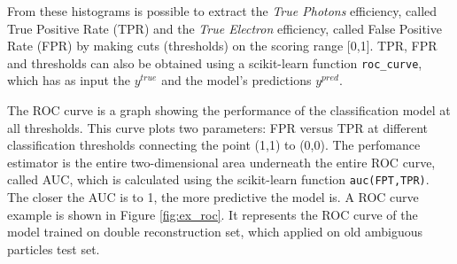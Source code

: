 \documentclass[a4paper, oneside]{book}
\begin{document}
		    From these histograms is possible to extract the \textit{True Photons} efficiency, called True Positive Rate (TPR) 
			and the \textit{True Electron} efficiency, called False Positive Rate (FPR) 
			by making cuts (thresholds) on the scoring range [0,1]. TPR, FPR and thresholds can also be obtained using a scikit-learn function \texttt{roc\_curve}, which has as input the $y^{true}$ and the model's predictions $y^{pred}$. 
			
			The ROC curve is a graph showing the performance of the  classification model at all thresholds. This curve plots two parameters: FPR versus TPR at different classification thresholds connecting the point (1,1) to (0,0). The perfomance estimator is the entire two-dimensional area underneath the entire ROC curve, called AUC, which is calculated using the scikit-learn function \texttt{auc(FPT,TPR)}. The closer the AUC is to 1, the more predictive the model is. A ROC curve example is shown in Figure \ref{fig:ex_roc}. It represents the ROC curve of the model trained on double reconstruction set, which applied on old ambiguous particles test set.
			
			
			
			
\end{document}
